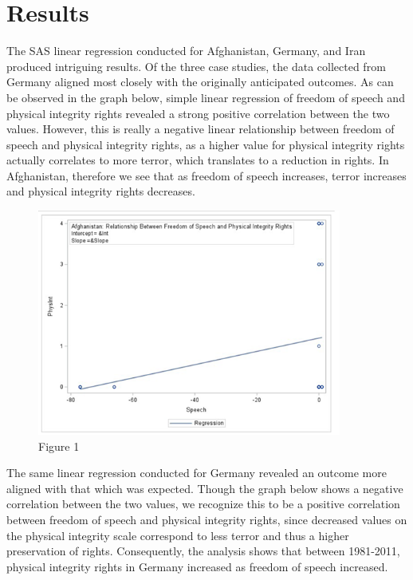 \documentclass{article}
\begin{document}
\section{Results}
The SAS linear regression conducted for Afghanistan, Germany, and Iran produced intriguing results. Of the three case studies, the data collected from Germany aligned most closely with the originally anticipated outcomes. As can be observed in the graph below, simple linear regression of freedom of speech and physical integrity rights revealed a strong positive correlation between the two values. However, this is really a negative linear relationship between freedom of speech and physical integrity rights, as a higher value for physical integrity rights actually correlates to more terror, which translates to a reduction in rights. In Afghanistan, therefore we see that as freedom of speech increases, terror increases and physical integrity rights decreases.

\begin{figure}[htp]
    \centering
    \includegraphics[width=10cm]{Afghanistan.png}
    \caption{Figure 1}
    \label{fig:Afghanistan}
\end{figure}

The same linear regression conducted for Germany revealed an outcome more aligned with that which was expected. Though the graph below shows a negative correlation between the two values, we recognize this to be a positive correlation between freedom of speech and physical integrity rights, since decreased values on the physical integrity scale correspond to less terror and thus a higher preservation of rights. Consequently, the analysis shows that between 1981-2011, physical integrity rights in Germany increased as freedom of speech increased.
\end{document}
